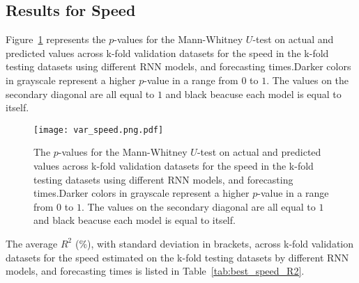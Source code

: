 \subsection{Results for Speed}

Figure~\ref{fig:var_speed.png} represents the $p$-values for the Mann-Whitney $U$-test on actual and predicted values across k-fold validation datasets for the speed in the k-fold testing datasets using different RNN models, and forecasting times.Darker colors in grayscale represent a higher $p$-value in a range from $0$ to $1$. The values on the secondary diagonal are all equal to $1$ and black beacuse each model is equal to itself.

\begin{figure}[!ht]
	\centering
	\texttt{[image: var\_speed.png.pdf]}
	\caption{The $p$-values for the Mann-Whitney $U$-test on actual and predicted values across k-fold validation datasets for the speed in the k-fold testing datasets using different RNN models, and forecasting times.Darker colors in grayscale represent a higher $p$-value in a range from $0$ to $1$. The values on the secondary diagonal are all equal to $1$ and black beacuse each model is equal to itself.}
	\label{fig:var_speed.png}
\end{figure}

The average $R^{2}$ (\%), with standard deviation in brackets, across k-fold validation datasets for the speed estimated on the k-fold testing datasets by different RNN models, and forecasting times is listed in Table~\ref{tab:best_speed_R2}.

\begin{table}[!ht]
	\centering
	\caption{The average $R^{2}$ (\%), with standard deviation in brackets, across k-fold validation datasets for the speed estimated on the k-fold testing datasets by different RNN models, and forecasting times.}
	\label{tab:best_speed_R2}
\end{table}


